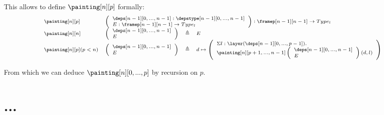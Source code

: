 \documentclass{msc}
\newcommand{\defeq}{\ensuremath{\triangleq}}
\begin{document}
This allows to define $\painting[n][p]$ formally:
\begin{equation*}
  \fontsize{7.2}{9}\selectfont
  \begin{array}{llcl}
    \painting[n][p]          &
    \multicolumn{3}{l}{
      \left(\begin{array}{l}
                \deps[n-1][0,...,n-1]:\depstype[n-1][0,...,n-1] \\
                E:\framep[n-1][n-1]\rightarrow Type_l           \\
              \end{array}\right) : \framep[n-1][n-1]\rightarrow Type_l
    }                                                            \\
    \painting[n][n]          &
    \left(\begin{array}{l}
              \deps[n-1][0,...,n-1] \\
              E                     \\
            \end{array}\right) & \defeq & E                        \\
    \painting[n][p](p<n)     &
    \left(\begin{array}{l}
              \deps[n-1][0,...,n-1] \\
              E                     \\
            \end{array}\right) & \defeq & d \mapsto
    \left(\begin{array}{l}
              \Sigma l:\layer(\deps[n-1][0,...,p-1]). \\
              \painting[n][p+1,...,n-1]
              \left(\begin{array}{l}
                  \deps[n-1][0,...,n-1] \\
                  E                     \\
                \end{array}\right)(d,l)           \\
            \end{array}\right) \\
  \end{array}
\end{equation*}

From which we can deduce $\painting[n][0,...,p]$ by recursion on $p$.

\section{...}
\end{document}
